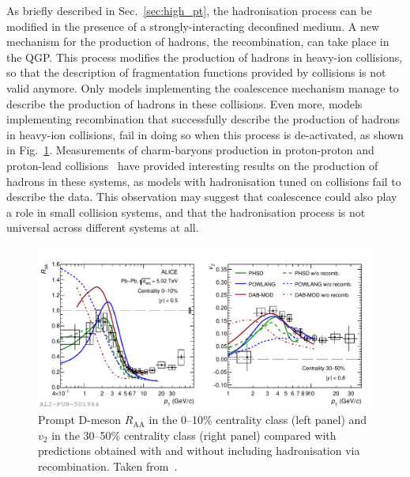 As briefly described in Sec.~\ref{sec:high_pt}, the hadronisation process can be modified in the presence of a strongly-interacting deconfined medium. A new mechanism for the production of hadrons, the recombination, can take place in the QGP. This process modifies the production of hadrons in heavy-ion collisions, so that the description of fragmentation functions provided by \ee collisions is not valid anymore. Only models implementing the coalescence mechanism manage to describe the production of hadrons in these collisions. Even more, models implementing recombination that successfully describe the production of hadrons in heavy-ion collisions, fail in doing so when this process is de-activated, as shown in Fig.~\ref{fig:D_recombination}. Measurements of charm-baryons production in proton-proton and proton-lead collisions~\cite{ALICE:2022exq,ALICE:xic0} have provided interesting results on the production of hadrons in these systems, as models with hadronisation tuned on \ee collisions fail to describe the data. This observation may suggest that coalescence could also play a role in small collision systems, and that the hadronisation process is not universal across different systems at all.
\begin{figure}[htb]
  \centering
  \includegraphics[width=\linewidth]{Figures/Chapter 2/D_Raa010_V23050_FragCoal_3models_1.pdf}
  \caption{Prompt D-meson $R_\mathrm{AA}$ in the 0--10\% centrality class (left panel) and $v_2$ in the 30--50\% centrality class (right panel) compared with predictions obtained with and without including hadronisation via recombination. Taken from~\cite{ALICE:2021rxa}.}
  \label{fig:D_recombination}
\end{figure}

